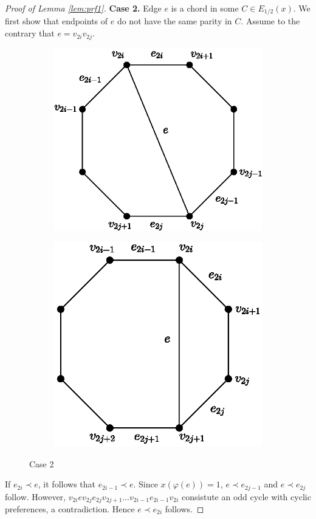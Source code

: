 \documentclass[11pt]{article}
\numberwithin{theorem}{section}
\begin{document}
\begin{proof}[Proof of Lemma \ref{lem:prf1}]
\textbf{Case 2.} Edge $e$ is a chord in some $C\in E_{1/2}(x)$. We first show that endpoints of $e$ do not have the same parity in $C$. Assume to the contrary that $e=v_{2i}v_{2j}$.
\begin{figure}
\centering
\begin{subfigure}{.4\textwidth}
  \centering
  \includegraphics[width=.85\linewidth]{KernelMengerianO-fig1a}
  \caption{}
  \label{fig1a}
\end{subfigure}%
\begin{subfigure}{.4\textwidth}
  \centering
  \includegraphics[width=.845\linewidth]{KernelMengerianO-fig1b}
  \caption{}
  \label{fig1b}
\end{subfigure}
\caption{Case 2}
\end{figure}
If $e_{2i}\prec e$, it follows that $e_{2i-1}\prec e$. Since $x(\varphi(e))=1$, $e\prec e_{2j-1}$ and $e\prec e_{2j}$ follow. However, $v_{2i} e v_{2j} e_{2j} v_{2j+1} \ldots v_{2i-1} e_{2i-1} v_{2i}$ consistute an odd cycle with cyclic preferences, a contradiction. Hence $e\prec e_{2i}$ follows.


\end{proof}
\end{document}
